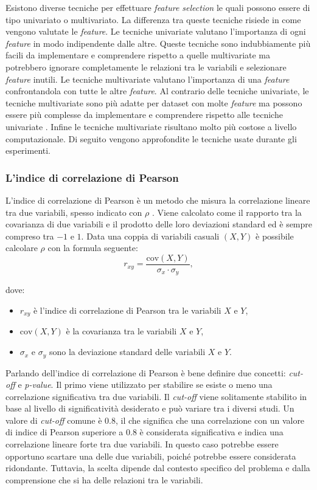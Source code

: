 \documentclass[12pt,italian]{report}
\begin{document}
	Esistono diverse tecniche per effettuare \textit{feature selection} le quali possono essere di tipo univariato o multivariato. La differenza tra queste tecniche risiede in come vengono valutate le \textit{feature}. Le tecniche univariate valutano l'importanza di ogni \textit{feature} in modo indipendente dalle altre. Queste tecniche sono indubbiamente più facili da implementare e comprendere rispetto a quelle multivariate ma potrebbero ignorare completamente le relazioni tra le variabili e selezionare \textit{feature} inutili. Le tecniche multivariate valutano l'importanza di una \textit{feature} confrontandola con tutte le altre \textit{feature}. Al contrario delle tecniche univariate, le tecniche multivariate sono più adatte per dataset con molte \textit{feature} ma possono essere più complesse da implementare e comprendere rispetto alle tecniche univariate \cite{goswami2014feature}. Infine le tecniche multivariate risultano molto più costose a livello computazionale.
	Di seguito vengono approfondite le tecniche usate durante gli esperimenti.
	
	\subsubsection{L'indice di correlazione di Pearson}
	\label{Pearson}
	L'indice di correlazione di Pearson è un metodo che misura la correlazione lineare tra due variabili, spesso indicato con $\rho$ \cite{Benesty2009}. Viene calcolato come il rapporto tra la covarianza di due variabili e il prodotto delle loro deviazioni standard ed è sempre compreso tra $-1$ e $1$.
	Data una coppia di variabili casuali $(X,Y)$ è possibile calcolare $\rho$ con la formula seguente:
	\begin{equation}
		r_{xy} = \frac{\text{cov}(X,Y)}{\sigma_x \cdot \sigma_y},
	\end{equation}

	
	dove:
	\begin{itemize}
		\item $r_{xy}$ è l'indice di correlazione di Pearson tra le variabili $X$ e $Y$,
		\item $\text{cov}(X,Y)$ è la covarianza tra le variabili $X$ e $Y$,
		\item $\sigma_x$ e $\sigma_y$ sono la deviazione standard delle variabili $X$ e $Y$.
	\end{itemize}
	
	Parlando dell'indice di correlazione di Pearson è bene definire due concetti: \textit{cut-off} e \textit{p-value}. Il primo viene utilizzato per stabilire se esiste o meno una correlazione significativa tra due variabili. Il \textit{cut-off} viene solitamente stabilito in base al livello di significatività desiderato e può variare tra i diversi studi. Un valore di \textit{cut-off} comune è $0.8$, il che significa che una correlazione con un valore di indice di Pearson superiore a $0.8$ è considerata significativa e indica una correlazione lineare forte tra due variabili. In questo caso potrebbe essere opportuno scartare una delle due variabili, poiché potrebbe essere considerata ridondante. Tuttavia, la scelta dipende dal contesto specifico del problema e dalla comprensione che si ha delle relazioni tra le variabili.
	
\end{document}
